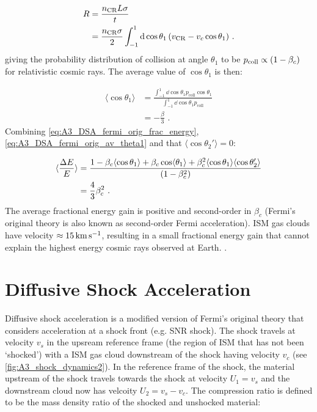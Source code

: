 \begin{equation}
    \begin{aligned}
        R&=\frac{n_\text{CR}L\sigma}{t} \\
        &=\frac{n_\text{CR}\sigma}{2}\int_{-1}^1\dd{\cos\theta_1}\qty(v_\text{CR}-v_c\cos\theta_1) \text{ .}
    \end{aligned}
\end{equation}
\noindent giving the probability distribution of collision at angle $\theta_1$ to be $p_\text{coll}\propto \qty(1-\beta_c)$ for relativistic cosmic rays. The average value of $\cos\theta_1$ is then:

\begin{equation}
    \begin{aligned}
        \langle \cos\theta_1\rangle &=\frac{\int_{-1}^1\dd{\cos\theta_1}p_\text{coll}\cos\theta_1}{\int_{-1}^1\dd{\cos\theta_1}p_\text{coll}} \\
        &=-\frac{\beta}{3} \text{ .}
    \end{aligned} \label{eq:A3_DSA_fermi_orig_av_theta1}
\end{equation} 
\noindent Combining \autoref{eq:A3_DSA_fermi_orig_frac_energy}, \autoref{eq:A3_DSA_fermi_orig_av_theta1} and that $\langle \cos\theta_2' \rangle=0$:

\begin{equation}
    \begin{aligned}
        \langle \frac{\Delta E}{E} \rangle&=\frac{1-\beta_c\langle\cos\theta_1\rangle+\beta_c\cos\langle\theta_1\rangle+\beta_c^2\langle\cos\theta_1\rangle\langle\cos\theta_2'\rangle}{\qty(1-\beta_c^2)} \\
        &= \frac{4}{3}\beta_c^2 \text{ .}
    \end{aligned}
\end{equation}
\noindent The average fractional energy gain is positive and second-order in $\beta_c$ (Fermi's original theory is also known as second-order Fermi acceleration). ISM gas clouds have velocity $\approx 15\,\si{\kilo\meter\per\second}$, resulting in a small fractional energy gain that cannot explain the highest energy cosmic rays observed at Earth. \citep{1949PhRv...75.1169F}. 

\section{Diffusive Shock Acceleration}

Diffusive shock acceleration is a modified version of Fermi's original theory that considers acceleration at a shock front (e.g. SNR shock). The shock travels at velocity $v_s$ in the upsream reference frame (the region of ISM that has not been `shocked') with a ISM gas cloud downstream of the shock having velocity $v_c$ (see \autoref{fig:A3_shock_dynamics2}). In the reference frame of the shock, the material upstream of the shock travels towards the shock at velocity $U_1=v_s$ and the downstream cloud now has velcoity $U_2=v_s-v_c$. The compression ratio is defined to be the mass density ratio of the shocked and unshocked material:

